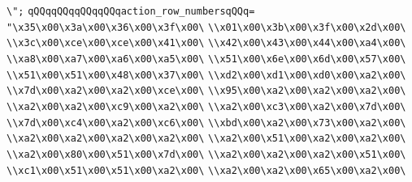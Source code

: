 \verb|\";|\newline
\verb|qQQqqQQqqQQqqQQqaction_row_numbersqQQq=|\newline
\verb|"\x35\x00\x3a\x00\x36\x00\x3f\x00\|\newline
\verb|\\x01\x00\x3b\x00\x3f\x00\x2d\x00\|\newline
\verb|\\x3c\x00\xce\x00\xce\x00\x41\x00\|\newline
\verb|\\x42\x00\x43\x00\x44\x00\xa4\x00\|\newline
\verb|\\xa8\x00\xa7\x00\xa6\x00\xa5\x00\|\newline
\verb|\\x51\x00\x6e\x00\x6d\x00\x57\x00\|\newline
\verb|\\x51\x00\x51\x00\x48\x00\x37\x00\|\newline
\verb|\\xd2\x00\xd1\x00\xd0\x00\xa2\x00\|\newline
\verb|\\x7d\x00\xa2\x00\xa2\x00\xce\x00\|\newline
\verb|\\x95\x00\xa2\x00\xa2\x00\xa2\x00\|\newline
\verb|\\xa2\x00\xa2\x00\xc9\x00\xa2\x00\|\newline
\verb|\\xa2\x00\xc3\x00\xa2\x00\x7d\x00\|\newline
\verb|\\x7d\x00\xc4\x00\xa2\x00\xc6\x00\|\newline
\verb|\\xbd\x00\xa2\x00\x73\x00\xa2\x00\|\newline
\verb|\\xa2\x00\xa2\x00\xa2\x00\xa2\x00\|\newline
\verb|\\xa2\x00\x51\x00\xa2\x00\xa2\x00\|\newline
\verb|\\xa2\x00\x80\x00\x51\x00\x7d\x00\|\newline
\verb|\\xa2\x00\xa2\x00\xa2\x00\x51\x00\|\newline
\verb|\\xc1\x00\x51\x00\x51\x00\xa2\x00\|\newline
\verb|\\xa2\x00\xa2\x00\x65\x00\xa2\x00\|\newline
